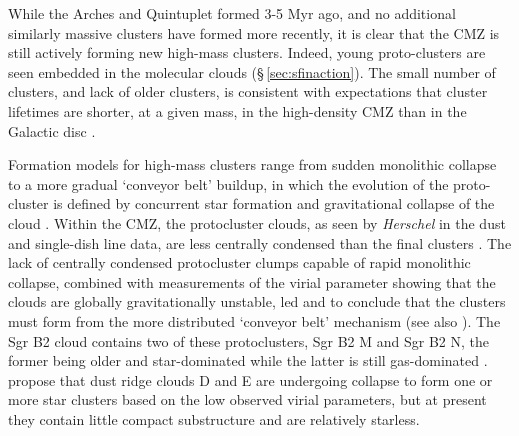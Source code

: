 While the Arches and Quintuplet formed 3-5 Myr ago, and no additional similarly massive clusters have formed more recently, it is clear that the CMZ is still actively forming new high-mass clusters. Indeed, young proto-clusters are seen embedded in the molecular clouds (\S\,\ref{sec:sfinaction}).
The small number of clusters, and lack of older clusters, is consistent with expectations that cluster lifetimes are shorter, at a given mass, in the high-density CMZ than in the Galactic disc \citep{Kruijssen2012}.

Formation models for high-mass clusters range from sudden monolithic collapse to a more gradual `conveyor belt' buildup, in which the evolution of the proto-cluster is defined by concurrent star formation and gravitational collapse of the cloud \citep[e.g.,][]{Longmore2014, Vazquez-Semadeni2019, Krumholz2019, Krumholz2020}.
Within the CMZ, the protocluster clouds, as seen by \emph{Herschel} in the dust and single-dish line data, are less centrally condensed than the final clusters \citep{Walker2015}.
The lack of centrally condensed protocluster clumps capable of rapid monolithic collapse, combined with measurements of the virial parameter showing that the clouds are globally gravitationally unstable, led \citet{Walker2016} and \citet{Barnes2019} to conclude that the clusters must form from the more distributed `conveyor belt' mechanism (see also \citealp{Schworer2019}).
The Sgr B2 cloud contains two of these protoclusters, Sgr B2 M and Sgr B2 N, the former being older and star-dominated while the latter is still gas-dominated \citep{Schmiedeke2016,Ginsburg2018b}.  
\citet{Barnes2019} propose that dust ridge clouds D and E are undergoing collapse to form one or more star clusters based on the low observed virial parameters, but at present they contain little compact substructure and are relatively starless.

